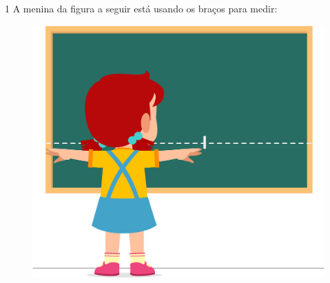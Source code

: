 











\pagebreak
{}

\num{1} A menina da figura a seguir está usando os braços para medir:


\begin{figure}[htpb!]
\centering
\includegraphics[width=.5\textwidth]{./media/image45.png}
\end{figure}

